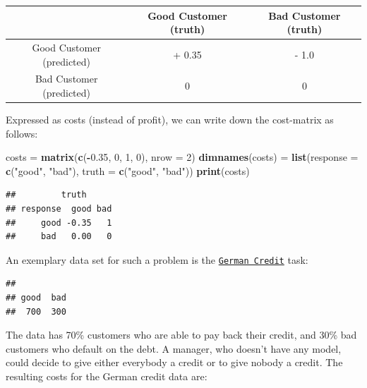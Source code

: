 \documentclass[]{scrbook}
\newenvironment{Shaded}{\begin{snugshade}}{\end{snugshade}}
\newcommand{\DataTypeTok}[1]{\textcolor[rgb]{0.13,0.29,0.53}{#1}}
\newcommand{\DecValTok}[1]{\textcolor[rgb]{0.00,0.00,0.81}{#1}}
\newcommand{\FloatTok}[1]{\textcolor[rgb]{0.00,0.00,0.81}{#1}}
\newcommand{\KeywordTok}[1]{\textcolor[rgb]{0.13,0.29,0.53}{\textbf{#1}}}
\newcommand{\NormalTok}[1]{#1}
\newcommand{\OperatorTok}[1]{\textcolor[rgb]{0.81,0.36,0.00}{\textbf{#1}}}
\newcommand{\StringTok}[1]{\textcolor[rgb]{0.31,0.60,0.02}{#1}}
\renewenvironment{Shaded} {\begin{snugshade}\small} {\end{snugshade}}
\begin{document}
\begin{longtable}[]{@{}ccc@{}}
\toprule
& Good Customer (truth) & Bad Customer (truth)\tabularnewline
\midrule
\endhead
Good Customer (predicted) & + 0.35 & - 1.0\tabularnewline
Bad Customer (predicted) & 0 & 0\tabularnewline
\bottomrule
\end{longtable}

Expressed as costs (instead of profit), we can write down the cost-matrix as follows:

\begin{Shaded}
\begin{Highlighting}[]
\NormalTok{costs =}\StringTok{ }\KeywordTok{matrix}\NormalTok{(}\KeywordTok{c}\NormalTok{(}\OperatorTok{-}\FloatTok{0.35}\NormalTok{, }\DecValTok{0}\NormalTok{, }\DecValTok{1}\NormalTok{, }\DecValTok{0}\NormalTok{), }\DataTypeTok{nrow =} \DecValTok{2}\NormalTok{)}
\KeywordTok{dimnames}\NormalTok{(costs) =}\StringTok{ }\KeywordTok{list}\NormalTok{(}\DataTypeTok{response =} \KeywordTok{c}\NormalTok{(}\StringTok{"good"}\NormalTok{, }\StringTok{"bad"}\NormalTok{), }\DataTypeTok{truth =} \KeywordTok{c}\NormalTok{(}\StringTok{"good"}\NormalTok{, }\StringTok{"bad"}\NormalTok{))}
\KeywordTok{print}\NormalTok{(costs)}
\end{Highlighting}
\end{Shaded}

\begin{verbatim}
##         truth
## response  good bad
##     good -0.35   1
##     bad   0.00   0
\end{verbatim}

An exemplary data set for such a problem is the \href{https://mlr3.mlr-org.com/reference/mlr_tasks_german_credit.html}{\texttt{German\ Credit}} task:

\begin{Shaded}
\end{Shaded}

\begin{verbatim}
## 
## good  bad 
##  700  300
\end{verbatim}

The data has 70\% customers who are able to pay back their credit, and 30\% bad customers who default on the debt.
A manager, who doesn't have any model, could decide to give either everybody a credit or to give nobody a credit.
The resulting costs for the German credit data are:
\end{document}
